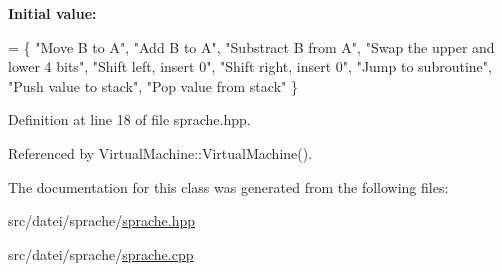 {\bfseries Initial value\+:}
\begin{DoxyCode}
= \{
    \textcolor{stringliteral}{"Move B to A"},
    \textcolor{stringliteral}{"Add B to A"},
    \textcolor{stringliteral}{"Substract B from A"},
    \textcolor{stringliteral}{"Swap the upper and lower 4 bits"},
    \textcolor{stringliteral}{"Shift left, insert 0"},
    \textcolor{stringliteral}{"Shift right, insert 0"},
    \textcolor{stringliteral}{"Jump to subroutine"},
    \textcolor{stringliteral}{"Push value to stack"},
    \textcolor{stringliteral}{"Pop value from stack"}
\}
\end{DoxyCode}


Definition at line 18 of file sprache.\+hpp.



Referenced by Virtual\+Machine\+::\+Virtual\+Machine().



The documentation for this class was generated from the following files\+:\begin{DoxyCompactItemize}
\item 
src/datei/sprache/\mbox{\hyperlink{sprache_8hpp}{sprache.\+hpp}}\item 
src/datei/sprache/\mbox{\hyperlink{sprache_8cpp}{sprache.\+cpp}}\end{DoxyCompactItemize}
